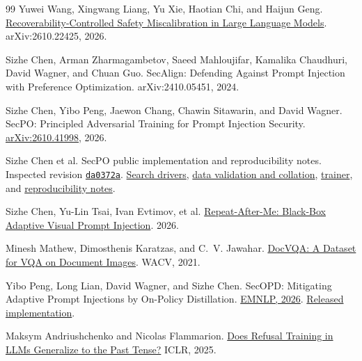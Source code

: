 \documentclass[11pt]{article}
\begin{document}
\begin{thebibliography}{99}
Yuwei Wang, Xingwang Liang, Yu Xie, Haotian Chi, and Haijun Geng.
\newblock \href{https://arxiv.org/abs/2610.22425}{Recoverability-Controlled Safety Miscalibration in Large Language Models}.
\newblock arXiv:2610.22425, 2026.

Sizhe Chen, Arman Zharmagambetov, Saeed Mahloujifar, Kamalika Chaudhuri, David Wagner, and Chuan Guo.
\newblock SecAlign: Defending Against Prompt Injection with Preference Optimization.
\newblock arXiv:2410.05451, 2024.

Sizhe Chen, Yibo Peng, Jaewon Chang, Chawin Sitawarin, and David Wagner.
\newblock SecPO: Principled Adversarial Training for Prompt Injection Security.
\newblock \href{https://arxiv.org/html/2610.41998v1}{arXiv:2610.41998}, 2026.

Sizhe Chen et al. SecPO public implementation and reproducibility notes.
\newblock Inspected revision \href{https://github.com/Sizhe-Chen/SecPO/tree/da0372a0e598badf4e51c98c175a962147cac2ac}{\texttt{da0372a}}.
\newblock \href{https://github.com/Sizhe-Chen/SecPO/tree/da0372a0e598badf4e51c98c175a962147cac2ac/src/secpo/attacks}{Search drivers},
\href{https://github.com/Sizhe-Chen/SecPO/blob/da0372a0e598badf4e51c98c175a962147cac2ac/src/secpo/data.py}{data validation and collation},
\href{https://github.com/Sizhe-Chen/SecPO/blob/da0372a0e598badf4e51c98c175a962147cac2ac/src/secpo/trainer.py}{trainer}, and
\href{https://github.com/Sizhe-Chen/SecPO/blob/da0372a0e598badf4e51c98c175a962147cac2ac/REPRODUCIBILITY.md}{reproducibility notes}.

Sizhe Chen, Yu-Lin Tsai, Ivan Evtimov, et al.
\newblock \href{https://arxiv.org/abs/2609.04533}{Repeat-After-Me: Black-Box Adaptive Visual Prompt Injection}. 2026.

Minesh Mathew, Dimosthenis Karatzas, and C.~V. Jawahar.
\newblock \href{https://openaccess.thecvf.com/content/WACV2021/html/Mathew_DocVQA_A_Dataset_for_VQA_on_Document_Images_WACV_2021_paper.html}{DocVQA: A Dataset for VQA on Document Images}. WACV, 2021.

Yibo Peng, Long Lian, David Wagner, and Sizhe Chen.
\newblock SecOPD: Mitigating Adaptive Prompt Injections by On-Policy Distillation.
\newblock \href{https://aclanthology.org/2026.emnlp-main.1102/}{EMNLP, 2026}. \href{https://github.com/pppyb/SecOPD}{Released implementation}.

Maksym Andriushchenko and Nicolas Flammarion.
\newblock \href{https://arxiv.org/abs/2407.11969}{Does Refusal Training in LLMs Generalize to the Past Tense?} ICLR, 2025.


\end{thebibliography}
\end{document}
